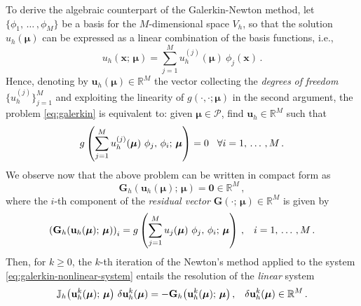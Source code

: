 \documentclass[12pt, a4paper, twoside, openright]{report}
\numberwithin{equation}{chapter}
\theoremstyle{theorem}
\theoremstyle{definition}
\theoremstyle{remark}
\theoremstyle{proposition}
\numberwithin{figure}{chapter}
\newcommand{\bg}[1]{\boldsymbol{#1}}
\begin{document}
		To derive the algebraic counterpart of the Galerkin-Newton method, let $\big\lbrace \phi_1, \, \ldots \, , \phi_M \big\rbrace$ be a basis for the $M$-dimensional space $V_h$, so that the solution $u_h(\bg{\mu})$ can be expressed as a linear combination of the basis functions, i.e.,
		\begin{equation}
			\label{eq:galerkin-solution}
			u_h(\bg{x}; \, \bg{\mu}) = \sum_{j = 1}^M u_h^{(j)}(\bg{\mu}) ~ \phi_j(\bg{x}) \, .
		\end{equation} 
		Hence, denoting by $\mathbf{u}_h(\bg{\mu}) \in \mathbb{R}^M$ the vector collecting the \emph{degrees} \emph{of} \emph{freedom} $\big\lbrace u_h^{(j)} \big\rbrace_{j = 1}^M$ and exploiting the linearity of $g(\cdot,\cdot; \bg{\mu})$ in the second argument, the problem \eqref{eq:galerkin} is equivalent to: given $\bg{\mu} \in \mathcal{P}$, find $\mathbf{u}_h \in \mathbb{R}^M$ such that
		\begin{equation}
			\label{eq:galerkin-algebraic}
			g \left( \sum_{j = 1}^M u_h^{(j)}(\bg{\mu}) ~ \phi_j, \, \phi_i; \, \bg{\mu} \right) = 0 \hspace*{0.3cm} \forall i = 1, \, \ldots \, , M \, .
		\end{equation}
		We observe now that the above problem can be written in compact form as
		\begin{equation}
			\label{eq:galerkin-nonlinear-system}
			\mathbf{G}_h (\mathbf{u}_h(\bg{\mu}); \, \bg{\mu}) = \bg{0} \in \mathbb{R}^M \, ,
		\end{equation}
		where the $i$-th component of the \emph{residual vector} $\mathbf{G}(\cdot; \, \bg{\mu}) \in \mathbb{R}^M$ is given by
		\begin{equation}
			\label{eq:galerkin-nonlinear-system-equation}
			\left( \mathbf{G}_h(\mathbf{u}_h(\bg{\mu}); \, \bg{\mu}) \right)_i = g \left( \sum_{j = 1}^M u_j(\bg{\mu}) ~ \phi_j, \, \phi_i; \, \bg{\mu} \right) \, , \hspace*{0.3cm} i = 1, \, \ldots \, , M \, .
		\end{equation}
		Then, for $k \geq 0$, the $k$-th iteration of the Newton's method applied to the system \eqref{eq:galerkin-nonlinear-system} entails the resolution of the \emph{linear} system
		\begin{equation}
			\label{eq:galerkin-linear-system}
			\mathbb{J}_h \big( \mathbf{u}^k_h(\bg{\mu}); \, \bg{\mu} \big) ~ \delta \mathbf{u}^k_h(\bg{\mu}) = - \mathbf{G}_h \big( \mathbf{u}^k_h(\bg{\mu}); \, \bg{\mu} \big) \, , \hspace*{0.3cm} \delta \mathbf{u}^k_h(\bg{\mu}) \in \mathbb{R}^M \, .
		\end{equation}
\end{document}
